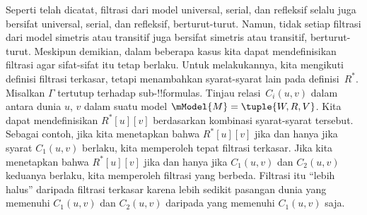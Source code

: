\documentclass[../../../include/open-logic-section]{subfiles}
\begin{document}


Seperti telah dicatat, filtrasi dari model universal, serial, dan refleksif
selalu juga bersifat universal, serial, dan refleksif, berturut-turut. Namun,
tidak setiap filtrasi dari model simetris atau transitif juga bersifat
simetris atau transitif, berturut-turut. Meskipun demikian, dalam beberapa kasus kita dapat
mendefinisikan filtrasi agar sifat-sifat itu tetap berlaku. Untuk
melakukannya, kita mengikuti definisi filtrasi terkasar, tetapi menambahkan
syarat-syarat lain pada definisi~$R^*$. Misalkan $\Gamma$ tertutup terhadap
sub-!!{formula}s. Tinjau relasi~$C_i(u,v)$ dalam
 antara dunia $u$, $v$ dalam suatu model
$\mModel{M} =\tuple{W, R, V}$. Kita dapat mendefinisikan $R^*[u][v]$
berdasarkan kombinasi syarat-syarat tersebut. Sebagai contoh, jika kita
menetapkan bahwa $R^*[u][v]$ jika dan hanya jika syarat $C_1(u,v)$ berlaku,
kita memperoleh tepat filtrasi terkasar. Jika kita menetapkan bahwa
$R^*[u][v]$ jika dan hanya jika $C_1(u,v)$ dan $C_2(u, v)$ keduanya berlaku,
kita memperoleh filtrasi yang berbeda. Filtrasi itu ``lebih halus'' daripada
filtrasi terkasar karena lebih sedikit pasangan dunia yang memenuhi
$C_1(u,v)$ dan $C_2(u,v)$ daripada yang memenuhi $C_1(u,v)$ saja.
\end{document}
